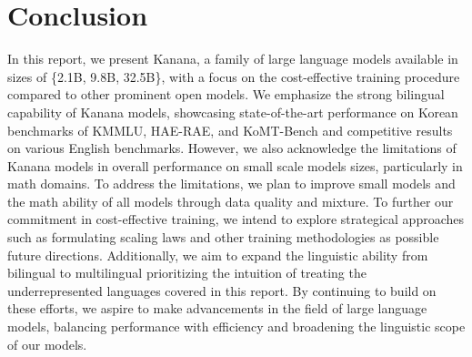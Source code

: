 \section{Conclusion}


In this report, we present Kanana, a family of large language models available in sizes of \{2.1B, 9.8B, 32.5B\}, with a focus on the cost-effective training procedure compared to other prominent open models.
We emphasize the strong bilingual capability of Kanana models, showcasing state-of-the-art performance on Korean benchmarks of KMMLU, HAE-RAE, and KoMT-Bench and competitive results on various English benchmarks.
However, we also acknowledge the limitations of Kanana models in overall performance on small scale models sizes, particularly in math domains.
To address the limitations, we plan to improve small models and the math ability of all models through data quality and mixture.
To further our commitment in cost-effective training, we intend to explore strategical approaches such as formulating scaling laws and other training methodologies as possible future directions.
Additionally, we aim to expand the linguistic ability from bilingual to multilingual prioritizing the intuition of treating the underrepresented languages covered in this report.
By continuing to build on these efforts, we aspire to make advancements in the field of large language models, balancing performance with efficiency and broadening the linguistic scope of our models.